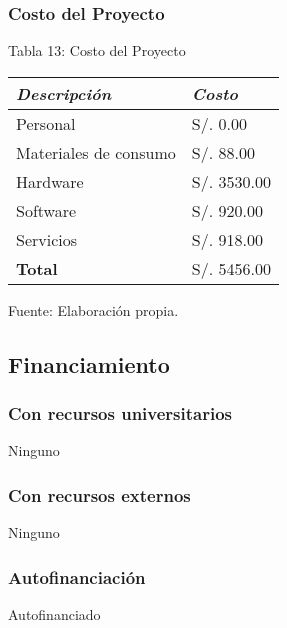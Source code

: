     \subsubsection{Costo del Proyecto}
        \begin{table}[h!]
            \centering
            { Tabla 13: Costo del Proyecto}\par
            \begin{tabular}{|p{5cm}|p{4cm}|} \hline


                \textit{{\bf{Descripción}}} &
                \textit{{\bf{Costo}}}
                \\ \hline

                Personal &
                S/. 0.00
                \\ \hline

                Materiales de consumo &
                S/. 88.00
                \\ \hline

                Hardware &
                S/. 3530.00
                \\ \hline

                Software &
                S/. 920.00
                \\ \hline

                Servicios &
                S/. 918.00
                \\ \hline

                \bf{Total} &
                S/. 5456.00
                \\ \hline

            \end{tabular}
            \begin{center}
                \vskip -0.2cm
                {\small{Fuente: Elaboración propia.}}
            \end{center}
        \end{table}

\subsection{Financiamiento}
    \subsubsection{Con recursos universitarios}
        Ninguno
    \subsubsection{Con recursos externos}
        Ninguno
    \subsubsection{Autofinanciación}
        Autofinanciado
